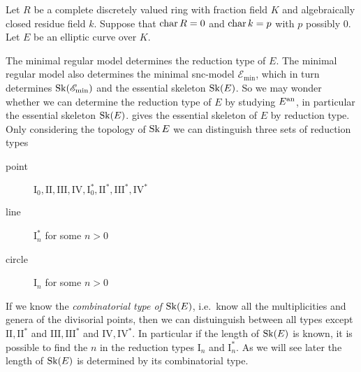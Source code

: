 Let $R$ be a complete discretely valued ring with fraction field $K$ and algebraically closed residue field $k$. Suppose that  $\operatorname{char} R = 0$ and $\operatorname{char} k = p$ with $p$ possibly $0$. 
Let $E$ be an elliptic curve over $K$.

The minimal regular model determines the reduction type of $E$. 
The minimal regular model also determines the minimal snc-model $\mathscr E_\text{min} $, which in turn determines $\operatorname{Sk}(\mathscr E_\text{min} )$ and the essential skeleton $\operatorname{Sk}(E)$. 
So we may wonder whether we can determine the reduction type of $E$ by studying $E{}^{\text{an}}$, in particular the essential skeleton $\operatorname{Sk}(E)$.
 gives the essential skeleton of $E$ by reduction type. 
Only considering the topology of $\operatorname{Sk} E$ we can distinguish three sets of reduction types 
\begin{description}
	\item[point] $\mathrm I_0, \mathrm{II}, \mathrm{III},\mathrm{IV}, \mathrm{I}_0^*, \mathrm{II}^*, \mathrm{III}^*, \mathrm{IV}^*$ 
	\item[line] $\mathrm{I}_n^*$ for some $n > 0$
	\item[circle]  $\mathrm{I}_n$ for some  $n > 0$
\end{description}
If we know the \emph{combinatorial type of $\operatorname{Sk}(E)$}, i.e.\ know all the multiplicities and genera of the divisorial points, then we can distuinguish between all types except $\mathrm{II}, \mathrm{II}^*$ and $\mathrm{III}, \mathrm{III}^*$ and  $\mathrm{IV}, \mathrm{IV}^*$.
In particular if the length of $\operatorname{Sk}(E)$ is known, it is possible to find the $n$ in the reduction types $\mathrm I_n$ and $\mathrm I_n^*$. 
As we will see later the length of $\operatorname{Sk}(E)$ is determined by its combinatorial type.


